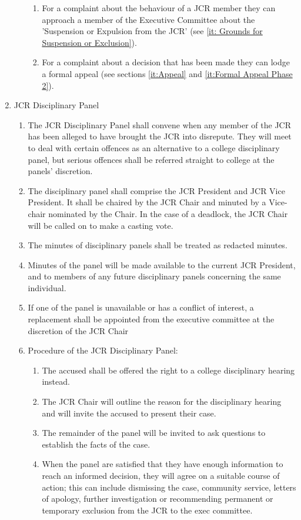 \begin{enumerate}
\begin{enumerate}
\begin{enumerate}
            \item For a complaint about the behaviour of a JCR member they can approach a member of the Executive Committee about the 'Suspension or Expulsion from the JCR' (see \ref{it: Grounds for Suspension or Exclusion}).
            \item For a complaint about a decision that has been made they can lodge a formal appeal (see sections \ref{it:Appeal} and \ref{it:Formal Appeal Phase 2}).
        \end{enumerate}
    \end{enumerate}
    \item JCR Disciplinary Panel
    \begin{enumerate}
        \item The JCR Disciplinary Panel shall convene when any member of the JCR has been alleged to have brought the JCR into disrepute. They will meet to deal with certain offences as an alternative to a college disciplinary panel, but serious offences shall be referred straight to college at the panels’ discretion.
        \item The disciplinary panel shall comprise the JCR President and JCR Vice President. It shall be chaired by the JCR Chair and minuted by a Vice-chair nominated by the Chair. In the case of a deadlock, the JCR Chair will be called on to make a casting vote.
        \item The minutes of disciplinary panels shall be treated as redacted minutes.
        \item Minutes of the panel will be made available to the current JCR President, and to members of any future disciplinary panels concerning the same individual.
        \item If one of the panel is unavailable or has a conflict of interest, a replacement shall be appointed from the executive committee at the discretion of the JCR Chair
        \item Procedure of the JCR Disciplinary Panel:
        \begin{enumerate}
            \item The accused shall be offered the right to a college disciplinary hearing instead.
            \item The JCR Chair will outline the reason for the disciplinary hearing and will invite the accused to present their case.
            \item The remainder of the panel will be invited to ask questions to establish the facts of the case.
            \item When the panel are satisfied that they have enough information to reach an informed decision, they will agree on a suitable course of action; this can include dismissing the case, community service, letters of apology, further investigation or recommending permanent or temporary exclusion from the JCR to the exec committee.

\end{enumerate}
\end{enumerate}
\end{enumerate}
